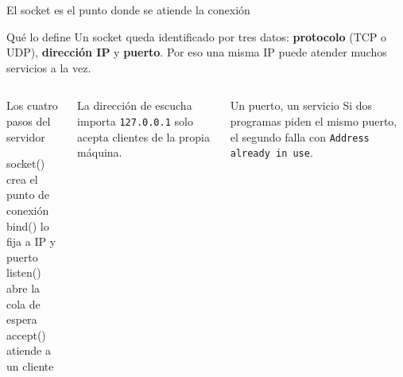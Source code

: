 \documentclass[aspectratio=169,10pt,c]{beamer}
\begin{document}
\begin{frame}{El socket es el punto donde se atiende la conexión}
\begin{block}{Qué lo define}
\small Un socket queda identificado por tres datos: \textbf{protocolo} (TCP o UDP), \textbf{dirección IP} y \textbf{puerto}. Por eso una misma IP puede atender muchos servicios a la vez.
\end{block}
\begin{columns}[T,onlytextwidth]
\begin{exampleblock}{Los cuatro pasos del servidor}
\begin{terminal}\footnotesize
socket()  crea el punto de conexión\\
bind()    lo fija a IP y puerto\\
listen()  abre la cola de espera\\
accept()  atiende a un cliente
\end{terminal}
\end{exampleblock}
\begin{block}{La dirección de escucha importa}
\small \texttt{127.0.0.1} solo acepta clientes de la propia máquina.
\end{block}
\begin{block}{Un puerto, un servicio}
\small Si dos programas piden el mismo puerto, el segundo falla con \texttt{Address already in use}.
\end{block}
\end{columns}
\end{frame}
\end{document}
